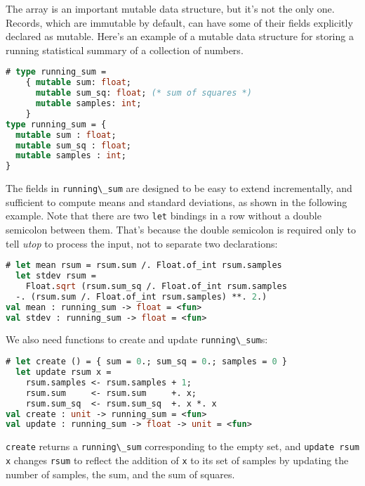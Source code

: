 The array is an important mutable data structure, but it's not the only
one. Records, which are immutable by default, can have some of their
fields explicitly declared as mutable. Here's an example of a mutable
data structure for storing a running statistical summary of a collection
of
numbers.

\begin{lstlisting}[language=Caml]
# type running_sum =
    { mutable sum: float;
      mutable sum_sq: float; (* sum of squares *)
      mutable samples: int;
    }
type running_sum = {
  mutable sum : float;
  mutable sum_sq : float;
  mutable samples : int;
}
\end{lstlisting}

The fields in \passthrough{\lstinline!running\_sum!} are designed to be
easy to extend incrementally, and sufficient to compute means and
standard deviations, as shown in the following example. Note that there
are two \passthrough{\lstinline!let!} bindings in a row without a double
semicolon between them. That's because the double semicolon is required
only to tell \emph{utop} to process the input, not to separate two
declarations:

\begin{lstlisting}[language=Caml]
# let mean rsum = rsum.sum /. Float.of_int rsum.samples
  let stdev rsum =
    Float.sqrt (rsum.sum_sq /. Float.of_int rsum.samples
  -. (rsum.sum /. Float.of_int rsum.samples) **. 2.)
val mean : running_sum -> float = <fun>
val stdev : running_sum -> float = <fun>
\end{lstlisting}

We also need functions to create and update
\passthrough{\lstinline!running\_sum!}s:

\begin{lstlisting}[language=Caml]
# let create () = { sum = 0.; sum_sq = 0.; samples = 0 }
  let update rsum x =
    rsum.samples <- rsum.samples + 1;
    rsum.sum     <- rsum.sum     +. x;
    rsum.sum_sq  <- rsum.sum_sq  +. x *. x
val create : unit -> running_sum = <fun>
val update : running_sum -> float -> unit = <fun>
\end{lstlisting}

\passthrough{\lstinline!create!} returns a
\passthrough{\lstinline!running\_sum!} corresponding to the empty set,
and \passthrough{\lstinline!update rsum x!} changes
\passthrough{\lstinline!rsum!} to reflect the addition of
\passthrough{\lstinline!x!} to its set of samples by updating the number
of samples, the sum, and the sum of squares.

